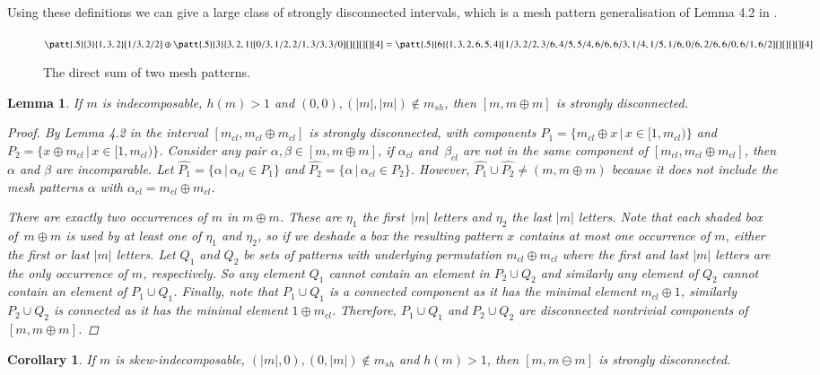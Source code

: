 \documentclass[preprint,11pt]{elsarticle}
\newtheorem{lem}[thm]{Lemma}\crefname{lem}{Lemma}{Lemmas}
\newtheorem{cor}[thm]{Corollary}\crefname{cor}{Corollary}{Corollaries}
\newcommand\cl[1]{#1_{cl}}
\newcommand\sh[1]{#1_{sh}}
\newcommand\h{h}
\numberwithin{equation}{section}
\numberwithin{figure}{section}
\numberwithin{thm}{section}
\begin{document}
Using these definitions we can give a large class of strongly disconnected intervals,
which is a mesh pattern generalisation of Lemma 4.2 in \cite{McSt13}.

\begin{figure}\centering
$\patt{.5}{3}{1,3,2}[1/3,2/2]\oplus\patt{.5}{3}{3,2,1}[0/3,1/2,2/1,3/3,3/0][][][][][4]
=\patt{.5}{6}{1,3,2,6,5,4}[1/3,2/2,3/6,4/5,5/4,6/6,6/3,1/4,1/5,1/6,0/6,2/6,6/0,6/1,6/2][][][][][4]$
\caption{The direct sum of two mesh patterns.}\label{fig:directsum}
\end{figure}

\begin{lem}
If $m$ is indecomposable, $\h(m) > 1$ and $(0,0),(|m|,|m|)\not\in\sh{m}$, then
$[m,m\oplus m]$ is strongly disconnected.
\begin{proof}
By Lemma 4.2 in \cite{McSt13} the interval $[\cl{m},\cl{m}\oplus \cl{m}]$ is strongly disconnected,
with components $P_1=\{\cl{m}\oplus x\,|\,x\in [1,\cl{m})\}$ and
$P_2=\{x\oplus \cl{m}\,|\,x\in [1,\cl{m})\}$. Consider any pair $\alpha,\beta\in[m,m\oplus m]$,
if $\cl{\alpha}$ and~$\cl{\beta}$ are not in the same component of  $[\cl{m},\cl{m}\oplus \cl{m}]$,
then $\alpha$ and $\beta$ are incomparable. Let $\hat{P_1}=\{\alpha\,|\,\cl{\alpha}\in P_1\}$
and $\hat{P_2}=\{\alpha\,|\,\cl{\alpha}\in P_2\}$. However, ${\hat{P_1}\cup\hat{P_2}\not=(m,m\oplus m)}$
because it does not include the mesh patterns $\alpha$ with ${\cl{\alpha}=\cl{m}\oplus \cl{m}}$.

There are exactly two occurrences of $m$ in $m\oplus m$. These are $\eta_1$ the first~$|m|$ letters
and $\eta_2$ the last $|m|$ letters. Note that each shaded box of~${m\oplus m}$ is used by at least one
of $\eta_1$ and $\eta_2$, so if we deshade a box the resulting pattern $x$ contains at most one occurrence of $m$,
either the first or last $|m|$ letters. Let $Q_1$ and $Q_2$ be sets of patterns with underlying permutation
$\cl{m}\oplus \cl{m}$ where the first and last $|m|$ letters are the only occurrence of $m$, respectively. So any
element $Q_1$ cannot contain an element in $P_2\cup Q_2$ and similarly any element of $Q_2$ cannot
contain an element of ${P_1\cup Q_1}$. Finally, note that $P_1\cup Q_1$ is a connected component as it has the minimal element
$\cl{m}\oplus1$, similarly $P_2\cup Q_2$ is connected as it has the minimal element $1\oplus\cl{m}$.
Therefore, $P_1\cup Q_1$ and $P_2\cup Q_2$ are disconnected
nontrivial components of $[m,m\oplus m]$.
\end{proof}
\end{lem}
\begin{cor}
If $m$ is skew-indecomposable, $(|m|,0),(0,|m|) \not\in\sh{m}$ and $\h(m)>1$, then
$[m,m\ominus m]$ is strongly disconnected.
\end{cor}
\end{document}
